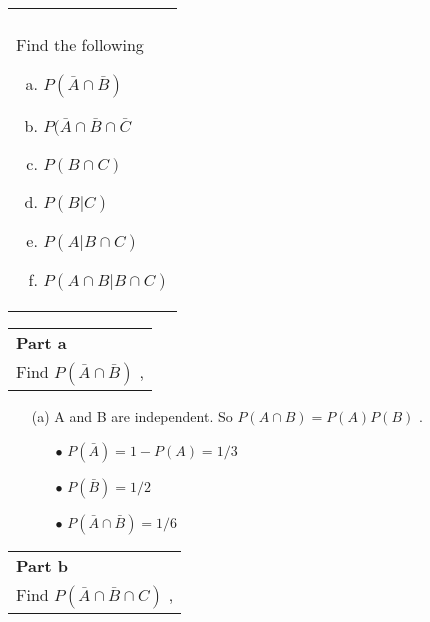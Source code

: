 \documentclass[a4paper,12pt]{article}
\begin{document}
\bigskip
\begin{table}[ht!]
 \centering
 \begin{tabular}{|p{15cm}|}
 \hline
 \large
 \\ \large
Find the following
\begin{multicols}{3}
\begin{enumerate}[(a)]
\item ${ \displaystyle P(\bar{A} \cap \bar{B} ) }$  

 
\item ${ \displaystyle P(\bar{A} \cap \bar{B} \cap \bar{C}   }$  
 
 
\item ${ \displaystyle P (B \cap  C) }$
 
\item ${ \displaystyle P (B |  C) }$

\item ${ \displaystyle P (A| B \cap  C) }$
 

\item ${ \displaystyle P (A  \cap  B| B \cap  C) }$
\end{enumerate} 
\end{multicols}
\\ \hline
  \end{tabular}
\end{table}
\newpage
\begin{table}[ht!]
 \centering
 \begin{tabular}{|p{15cm}|}
 \hline
 \large
\noindent \textbf{Part a} \\
\large
Find $P(\bar{A} \cap \bar{B} )$ ,
\\ \hline
  \end{tabular}
\end{table}

\large
\begin{itemize}
\item[(a)] A and B are independent. So $P(A\cap B) = P(A)P(B)$ .

\begin{itemize}
\item[$\bullet$] $P (\bar{A}) = 1 - P(A) = 1/3 $
\item[$\bullet$] $P (\bar{B}) = 1/2$
\item[$\bullet$] $P (\bar{A} \cap \bar{B} )= 1/6$
\end{itemize}
\end{itemize}
\newpage
\begin{table}[ht!]
 \centering
 \begin{tabular}{|p{15cm}|}
 \hline
 \large
\noindent \textbf{Part b} \\
\large Find
$P(\bar{A} \cap \bar{B} \cap{C})$ ,
\\ \hline
  \end{tabular}
\end{table}
\end{document}
